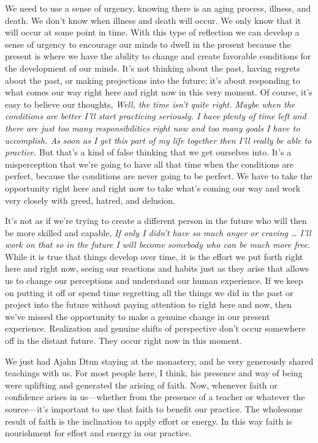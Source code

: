 We need to use a sense of urgency, knowing there is an aging process, 
illness, and death. We don't know when illness and death will occur. We 
only know that it will occur at some point in time. With this type of 
reflection we can develop a sense of urgency to encourage our minds to 
dwell in the present because the present is where we have the ability 
to change and create favorable conditions for the development of our 
minds. It's not thinking about the past, having regrets about the past, 
or making projections into the future; it's about responding to what 
comes our way right here and right now in this very moment. Of course, 
it's easy to believe our thoughts, \emph{Well, the time isn't quite 
right. Maybe when the conditions are better I'll start practicing 
seriously. I have plenty of time left and there are just too many 
responsibilities right now and too many goals I have to accomplish. As 
soon as I get this part of my life together then I'll really be able to 
practice.} But that's a kind of false thinking that we get ourselves 
into. It's a misperception that we're going to have all that time when 
the conditions are perfect, because the conditions are never going to 
be perfect. We have to take the opportunity right here and right now to 
take what's coming our way and work very closely with greed, hatred, 
and delusion.

It's not as if we're trying to create a different person in the future 
who will then be more skilled and capable, \emph{If only I didn't have 
so much anger or craving \ldots{} I'll work on that so in the future I 
will become somebody who can be much more free.} While it is true that 
things develop over time, it is the effort we put forth right here and 
right now, seeing our reactions and habits just as they arise that 
allows us to change our perceptions and understand our human 
experience. If we keep on putting it off or spend time regretting all 
the things we did in the past or project into the future without paying 
attention to right here and now, then we've missed the opportunity to 
make a genuine change in our present experience. Realization and 
genuine shifts of perspective don't occur somewhere off in the distant 
future. They occur right now in this moment.


We just had Ajahn Dtun staying at the monastery, and he very generously 
shared teachings with us. For most people here, I think, his presence 
and way of being were uplifting and generated the arising of faith. 
Now, whenever faith or confidence arises in us---whether from the 
presence of a teacher or whatever the source---it's important to use 
that faith to benefit our practice. The wholesome result of faith is 
the inclination to apply effort or energy. In this way faith is 
nourishment for effort and energy in our practice.

